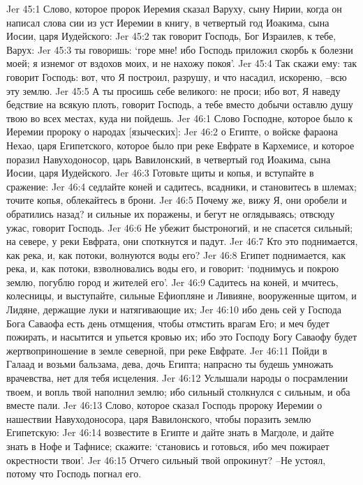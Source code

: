 Jer 45:1  Слово, которое пророк Иеремия сказал Варуху, сыну Нирии, когда он написал слова сии из уст Иеремии в книгу, в четвертый год Иоакима, сына Иосии, царя Иудейского:
Jer 45:2  так говорит Господь, Бог Израилев, к тебе, Варух:
Jer 45:3  ты говоришь: `горе мне! ибо Господь приложил скорбь к болезни моей; я изнемог от вздохов моих, и не нахожу покоя'.
Jer 45:4  Так скажи ему: так говорит Господь: вот, что Я построил, разрушу, и что насадил, искореню, --всю эту землю.
Jer 45:5  А ты просишь себе великого: не проси; ибо вот, Я наведу бедствие на всякую плоть, говорит Господь, а тебе вместо добычи оставлю душу твою во всех местах, куда ни пойдешь.
Jer 46:1  Слово Господне, которое было к Иеремии пророку о народах [языческих]:
Jer 46:2  о Египте, о войске фараона Нехао, царя Египетского, которое было при реке Евфрате в Кархемисе, и которое поразил Навуходоносор, царь Вавилонский, в четвертый год Иоакима, сына Иосии, царя Иудейского.
Jer 46:3  Готовьте щиты и копья, и вступайте в сражение:
Jer 46:4  седлайте коней и садитесь, всадники, и становитесь в шлемах; точите копья, облекайтесь в брони.
Jer 46:5  Почему же, вижу Я, они оробели и обратились назад? и сильные их поражены, и бегут не оглядываясь; отвсюду ужас, говорит Господь.
Jer 46:6  Не убежит быстроногий, и не спасется сильный; на севере, у реки Евфрата, они споткнутся и падут.
Jer 46:7  Кто это поднимается, как река, и, как потоки, волнуются воды его?
Jer 46:8  Египет поднимается, как река, и, как потоки, взволновались воды его, и говорит: `поднимусь и покрою землю, погублю город и жителей его'.
Jer 46:9  Садитесь на коней, и мчитесь, колесницы, и выступайте, сильные Ефиопляне и Ливияне, вооруженные щитом, и Лидяне, держащие луки и натягивающие их;
Jer 46:10  ибо день сей у Господа Бога Саваофа есть день отмщения, чтобы отмстить врагам Его; и меч будет пожирать, и насытится и упьется кровью их; ибо это Господу Богу Саваофу будет жертвоприношение в земле северной, при реке Евфрате.
Jer 46:11  Пойди в Галаад и возьми бальзама, дева, дочь Египта; напрасно ты будешь умножать врачевства, нет для тебя исцеления.
Jer 46:12  Услышали народы о посрамлении твоем, и вопль твой наполнил землю; ибо сильный столкнулся с сильным, и оба вместе пали.
Jer 46:13  Слово, которое сказал Господь пророку Иеремии о нашествии Навуходоносора, царя Вавилонского, чтобы поразить землю Египетскую:
Jer 46:14  возвестите в Египте и дайте знать в Магдоле, и дайте знать в Нофе и Тафнисе; скажите: `становись и готовься, ибо меч пожирает окрестности твои'.
Jer 46:15  Отчего сильный твой опрокинут? --Не устоял, потому что Господь погнал его.

